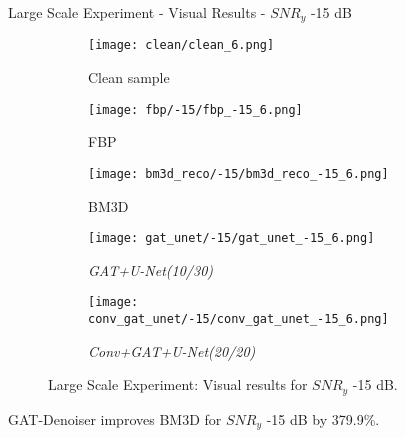 \begin{frame}{Large Scale Experiment - Visual Results - $SNR_y$ -15 dB}
    \begin{figure}
        \captionsetup[subfigure]{justification=centering}
        \centering
        \begin{subfigure}[t]{0.18\textwidth}
          \texttt{[image: clean/clean\_6.png]}
          \caption{Clean sample}
        \end{subfigure} \hfill
        \begin{subfigure}[t]{0.18\textwidth}
          \texttt{[image: fbp/-15/fbp\_-15\_6.png]}
          \caption{FBP}
        \end{subfigure} \hfill
        \begin{subfigure}[t]{0.18\textwidth}
          \texttt{[image: bm3d\_reco/-15/bm3d\_reco\_-15\_6.png]}
          \caption{BM3D}
        \end{subfigure} \hfill
        \begin{subfigure}[t]{0.18\textwidth}
          \texttt{[image: gat\_unet/-15/gat\_unet\_-15\_6.png]}
          \caption{\textit{GAT+U-Net(10/30)}}
        \end{subfigure} \hfill
        \begin{subfigure}[t]{0.18\textwidth}
          \texttt{[image: conv\_gat\_unet/-15/conv\_gat\_unet\_-15\_6.png]}
          \caption{\textit{Conv+GAT+U-Net(20/20)}}
        \end{subfigure} \hfill
        \caption{Large Scale Experiment: Visual results for $SNR_y$ -15 dB.}
      \end{figure}
      
    
      \begin{tcolorbox}[colback=red!5!white, colframe=red!75!black]
        GAT-Denoiser improves BM3D for $SNR_y$ -15 dB by 379.9\%.
        \end{tcolorbox}
        
\end{frame}
